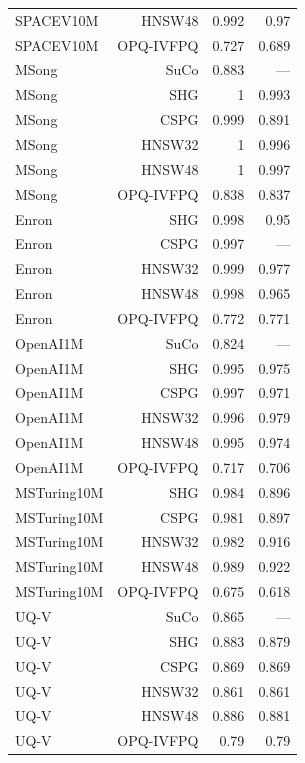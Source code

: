 \begin{table}[t]
\begin{tabular}{lrrr}
SPACEV10M & HNSW48 & 0.992 & 0.97 \\
SPACEV10M & OPQ-IVFPQ & 0.727 & 0.689 \\
MSong & SuCo & 0.883 & — \\
MSong & SHG & 1 & 0.993 \\
MSong & CSPG & 0.999 & 0.891 \\
MSong & HNSW32 & 1 & 0.996 \\
MSong & HNSW48 & 1 & 0.997 \\
MSong & OPQ-IVFPQ & 0.838 & 0.837 \\
Enron & SHG & 0.998 & 0.95 \\
Enron & CSPG & 0.997 & — \\
Enron & HNSW32 & 0.999 & 0.977 \\
Enron & HNSW48 & 0.998 & 0.965 \\
Enron & OPQ-IVFPQ & 0.772 & 0.771 \\
OpenAI1M & SuCo & 0.824 & — \\
OpenAI1M & SHG & 0.995 & 0.975 \\
OpenAI1M & CSPG & 0.997 & 0.971 \\
OpenAI1M & HNSW32 & 0.996 & 0.979 \\
OpenAI1M & HNSW48 & 0.995 & 0.974 \\
OpenAI1M & OPQ-IVFPQ & 0.717 & 0.706 \\
MSTuring10M & SHG & 0.984 & 0.896 \\
MSTuring10M & CSPG & 0.981 & 0.897 \\
MSTuring10M & HNSW32 & 0.982 & 0.916 \\
MSTuring10M & HNSW48 & 0.989 & 0.922 \\
MSTuring10M & OPQ-IVFPQ & 0.675 & 0.618 \\
UQ-V & SuCo & 0.865 & — \\
UQ-V & SHG & 0.883 & 0.879 \\
UQ-V & CSPG & 0.869 & 0.869 \\
UQ-V & HNSW32 & 0.861 & 0.861 \\
UQ-V & HNSW48 & 0.886 & 0.881 \\
UQ-V & OPQ-IVFPQ & 0.79 & 0.79 \\
\bottomrule
\end{tabular}
\end{table}
